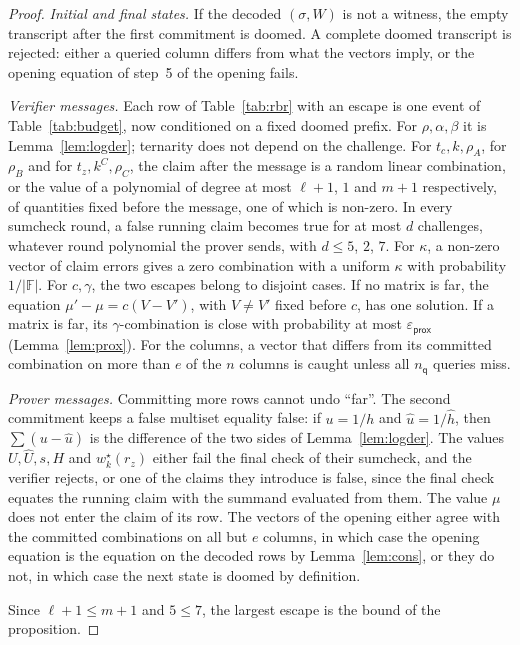 \documentclass[sigconf,anonymous]{acmart}
\newcommand{\F}{\mathbb{F}}
\newcommand{\msk}[1]{#1^{\star}}
\newcommand{\epsprox}{\varepsilon_{\mathsf{prox}}}
\newcommand{\nq}{n_{\mathsf{q}}}
\newcommand{\uh}{\hat{u}}
\newcommand{\hh}{\hat{h}}
\begin{document}
\begin{proof}
\emph{Initial and final states.} If the decoded $(\sigma,W)$ is not a witness, the empty
transcript after the first commitment is doomed. A complete doomed transcript is rejected: either a
queried column differs from what the vectors imply, or the opening equation of step~5 of the opening
fails.

\emph{Verifier messages.} Each row of Table~\ref{tab:rbr} with an escape is one event of
Table~\ref{tab:budget}, now conditioned on a fixed doomed prefix. For $\rho,\alpha,\beta$ it is
Lemma~\ref{lem:logder}; ternarity does not depend on the challenge. For $t_c,k,\rho_A$, for $\rho_B$
and for $t_z,k^C,\rho_C$, the claim after the message is a random linear combination, or the value of
a polynomial of degree at most $\ell+1$, $1$ and $m+1$ respectively, of quantities fixed before the
message, one of which is non-zero. In every sumcheck round, a false running claim becomes true for
at most $d$ challenges, whatever round polynomial the prover sends, with $d\le 5$, $2$, $7$. For
$\kappa$, a non-zero vector of claim errors gives a zero combination with a uniform $\kappa$ with
probability $1/|\F|$. For $c,\gamma$, the two escapes belong to disjoint cases. If no matrix is far,
the equation $\mu'-\mu=c(V-V')$, with $V\ne V'$ fixed before $c$, has one solution. If a matrix is
far, its $\gamma$-combination is close with probability at most $\epsprox$ (Lemma~\ref{lem:prox}).
For the columns, a vector that differs from its committed combination on more than $e$ of the $n$
columns is caught unless all $\nq$ queries miss.

\emph{Prover messages.} Committing more rows cannot undo ``far''. The second commitment keeps a
false multiset equality false: if $u=1/h$ and $\uh=1/\hh$, then $\sum(u-\uh)$ is the difference of the
two sides of Lemma~\ref{lem:logder}. The values $U,\hat U,s,H$ and $\msk{w}_k(r_z)$ either fail the
final check of their sumcheck, and the verifier rejects, or one of the claims they introduce is
false, since the final check equates the running claim with the summand evaluated from them. The
value $\mu$ does not enter the claim of its row. The vectors of the opening either agree with the
committed combinations on all but $e$ columns, in which case the opening equation is the equation
on the decoded rows by Lemma~\ref{lem:cons}, or they do not, in which case the next state is doomed
by definition.

Since $\ell+1\le m+1$ and $5\le 7$, the largest escape is the bound of the proposition.
\end{proof}
\end{document}
